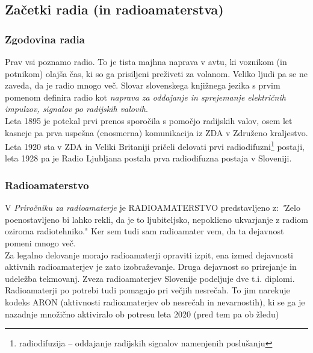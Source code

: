 \documentclass[12pt]{article}
\begin{document}
    \subsection{Začetki radia (in radioamaterstva)}
        \subsubsection{Zgodovina radia}
            Prav vsi poznamo radio. To je tista majhna naprava v avtu, ki 
            voznikom (in potnikom) olajša čas, ki so ga prisiljeni preživeti za
            volanom. Veliko ljudi pa se ne zaveda, da je radio mnogo več. Slovar
            slovenskega knjižnega jezika s prvim pomenom definira radio
            kot \textit{naprava za oddajanje in sprejemanje električnih 
            impulzov, signalov po radijskih valovih}. \cite{SSKJ-radio}\\
            Leta 1895 \cite{ppt} je potekal prvi prenos sporočila s pomočjo 
            radijskih valov, osem let kasneje pa prva uspešna (enosmerna) 
            komunikacija iz ZDA v Združeno kraljestvo. Leta 1920 sta v ZDA in 
            Veliki Britaniji pričeli delovati prvi radiodifuzni\footnote{
            radiodifuzija – oddajanje radijskih signalov namenjenih poslušanju} 
            postaji, leta 1928 pa je Radio Ljubljana postala prva radiodifuzna 
            postaja v Sloveniji.
        \subsubsection{Radioamaterstvo}
            V \textit{Priročniku za radioamaterje} je RADIOAMATERSTVO 
            predstavljeno z: \textit{"}Zelo poenostavljeno bi lahko rekli, da je
            to ljubiteljsko, nepoklicno ukvarjanje z radiom oziroma 
            radiotehniko." \cite{HAM-prirocnik} Ker sem tudi sam radioamater 
            vem, da ta dejavnost pomeni mnogo več. \\
            Za legalno delovanje morajo radioamaterji opraviti izpit, ena izmed
            dejavnosti aktivnih radioamaterjev je zato izobraževanje. Druga 
            dejavnost so prirejanje in udeležba tekmovanj. Zveza radioamaterjev
            Slovenije podeljuje dve t.i. diplomi.\\
            Radioamaterji po potrebi tudi pomagajo pri večjih nesrečah. To jim 
            narekuje kodeks ARON (aktivnosti radioamaterjev ob nesrečah in 
            nevarnostih), ki se ga je nazadnje množično aktiviralo ob potresu 
            leta 2020 (pred tem pa ob žledu)
\end{document}
